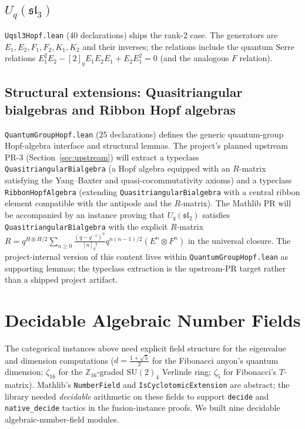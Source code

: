 \documentclass[11pt]{article}
\begin{document}
\subsection{$U_q(\mathfrak{sl}_3)$}

\texttt{Uqsl3Hopf.lean} (40 declarations) ships the rank-2 case. The
generators are $E_1, E_2, F_1, F_2, K_1, K_2$ and their inverses;
the relations include the quantum Serre relations
$E_1^2 E_2 - [2]_q E_1 E_2 E_1 + E_2 E_1^2 = 0$
(and the analogous $F$ relation).

\subsection{Structural extensions: Quasitriangular bialgebras and
Ribbon Hopf algebras}

\texttt{QuantumGroupHopf.lean} (25 declarations) defines the generic
quantum-group Hopf-algebra interface and structural lemmas. The
project's planned upstream PR-3 (Section~\ref{sec:upstream}) will
extract a typeclass \texttt{QuasitriangularBialgebra} (a Hopf
algebra equipped with an $R$-matrix satisfying the Yang--Baxter
and quasi-cocommutativity axioms) and a typeclass
\texttt{RibbonHopfAlgebra} (extending
\texttt{QuasitriangularBialgebra} with a central ribbon element
compatible with the antipode and the $R$-matrix). The Mathlib
PR will be accompanied by an instance proving that
$U_q(\mathfrak{sl}_2)$ satisfies
\texttt{QuasitriangularBialgebra} with the explicit $R$-matrix
$R = q^{H \otimes H/2} \sum_{n \geq 0} \frac{(q - q^{-1})^n}{[n]_q!}
q^{n(n-1)/2} (E^n \otimes F^n)$ in the universal closure. The
project-internal version of this content lives within
\texttt{QuantumGroupHopf.lean} as supporting lemmas; the
typeclass extraction is the upstream-PR target rather than a
shipped project artifact.


\section{Decidable Algebraic Number Fields}
\label{sec:numberfields}

The categorical instances above need explicit field structure for
the eigenvalue and dimension computations
($d = \frac{1+\sqrt{5}}{2}$ for the Fibonacci anyon's quantum
dimension; $\zeta_{16}$ for the $\mathbb{Z}_{16}$-graded
$\mathrm{SU}(2)_4$ Verlinde ring; $\zeta_5$ for Fibonacci's
$T$-matrix). Mathlib's \texttt{NumberField} and
\texttt{IsCyclotomicExtension} are abstract; the library needed
\emph{decidable} arithmetic on these fields to support
\texttt{decide} and \texttt{native\_decide} tactics in the
fusion-instance proofs. We built nine decidable algebraic-number-field
modules.
\end{document}
